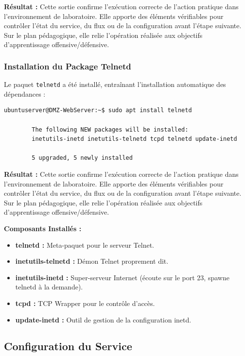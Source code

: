 \documentclass[12pt,a4paper,openany]{report}
\begin{document}
	\textbf{Résultat :} Cette sortie confirme l'exécution correcte de l'action pratique dans l'environnement de laboratoire. Elle apporte des éléments vérifiables pour contrôler l'état du service, du flux ou de la configuration avant l'étape suivante. Sur le plan pédagogique, elle relie l'opération réalisée aux objectifs d'apprentissage offensive/défensive.
	
	
	\subsubsection{Installation du Package Telnetd}
	Le paquet \texttt{telnetd} a été installé, entraînant l'installation automatique des dépendances :
	
	\begin{lstlisting}[caption=Installation de Telnet Server]
		ubuntuserver@DMZ-WebServer:~$ sudo apt install telnetd
		
		The following NEW packages will be installed:
		inetutils-inetd inetutils-telnetd tcpd telnetd update-inetd
		
		5 upgraded, 5 newly installed
	\end{lstlisting}
	
	\textbf{Résultat :} Cette sortie confirme l'exécution correcte de l'action pratique dans l'environnement de laboratoire. Elle apporte des éléments vérifiables pour contrôler l'état du service, du flux ou de la configuration avant l'étape suivante. Sur le plan pédagogique, elle relie l'opération réalisée aux objectifs d'apprentissage offensive/défensive.
	
	
	\textbf{Composants Installés :}
	\begin{itemize}
		\item \textbf{telnetd :} Meta-paquet pour le serveur Telnet.
		\item \textbf{inetutils-telnetd :} Démon Telnet proprement dit.
		\item \textbf{inetutils-inetd :} Super-serveur Internet (écoute sur le port 23, spawne telnetd à la demande).
		\item \textbf{tcpd :} TCP Wrapper pour le contrôle d'accès.
		\item \textbf{update-inetd :} Outil de gestion de la configuration inetd.
	\end{itemize}
	
	\subsection{Configuration du Service}
	
\end{document}
